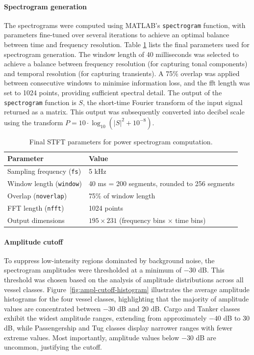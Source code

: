 \paragraph{Spectrogram generation}
The spectrograms were computed using MATLAB's \texttt{spectrogram} function, with parameters fine-tuned over several iterations to achieve an optimal balance between time and frequency resolution. Table \ref{tab:powerspectrogram-parameters} lists the final parameters used for spectrogram generation. The window length of 40 milliseconds was selected to achieve a balance between frequency resolution (for capturing tonal components) and temporal resolution (for capturing transients). A 75\% overlap was applied between consecutive windows to minimise information loss, and the \acrshort{fft} length was set to 1024 points, providing sufficient spectral detail. The output of the \texttt{spectrogram} function is $S$, the short-time Fourier transform of the input signal returned as a matrix. This output was subsequently converted into decibel scale using the transform $P = 10 \cdot \log_{10}(|S|^2 + 10^{-8})$.

\begin{table}[htbp]
    \centering
    \caption{Final STFT parameters for power spectrogram computation.}
    \label{tab:powerspectrogram-parameters}
    \begin{tabular}{ll} \toprule 
    \textbf{Parameter} & \textbf{Value} \\ \midrule 
    Sampling frequency (\texttt{fs}) & 5 kHz \\ 
    Window length (\texttt{window}) & 40 ms = 200 segments, rounded to 256 segments \\ 
    Overlap (\texttt{noverlap}) & 75\% of window length \\ 
    FFT length (\texttt{nfft}) & 1024 points \\ 
    Output dimensions & $195 \times 231$ (frequency bins $\times$ time bins) \\ \bottomrule
    \end{tabular}
\end{table}

\paragraph{Amplitude cutoff}
To suppress low-intensity regions dominated by background noise, the spectrogram amplitudes were thresholded at a minimum of $-30$ dB. This threshold was chosen based on the analysis of amplitude distributions across all vessel classes. Figure~\ref{fig:ampl-cutoff-histogram} illustrates the average amplitude histograms for the four vessel classes, highlighting that the majority of amplitude values are concentrated between $-30$ dB and 20 dB. Cargo and Tanker classes exhibit the widest amplitude ranges, extending from approximately $-40$ dB to 30 dB, while Passengership and Tug classes display narrower ranges with fewer extreme values. Most importantly, amplitude values below $-30$ dB are uncommon, justifying the cutoff.

